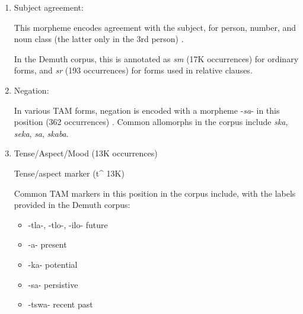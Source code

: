 \documentclass[11pt,letterpaper]{article}
\begin{document}
\begin{enumerate}
    \item Subject agreement: 
    
    This morpheme encodes agreement with the subject, for person, number, and noun class (the latter only in the 3rd person) \cite[]{doke1967textbook} \cite[p. 162]{guma1971outline}.
    
    In the Demuth corpus, this is annotated as \textit{sm} (17K occurrences) for ordinary forms, and \textit{sr} (193 occurrences) for forms used in relative clauses.

   
    
    \item Negation:
    
    In various TAM forms, negation is encoded with a morpheme -\textit{sa}- in this position (362 occurrences) \cite[p. 172]{guma1971outline} \cite[]{doke1967textbook}.
    Common allomorphs in the corpus include \textit{ska}, \textit{seka}, \textit{sa}, \textit{skaba}.
    
    
    
    \item Tense/Aspect/Mood (13K occurrences)
    
    Tense/aspect marker (t\^{} 13K) \cite[p. 165]{guma1971outline}
    
    Common TAM markers in this position in the corpus include, with the labels provided in the Demuth corpus:
    
    \begin{itemize}
    \item -tla-, -tlo-, -ilo- future \cite[--412]{doke1967textbook}
    \item -a- present \cite[]{doke1967textbook}
    \item -ka- potential \cite[--428]{doke1967textbook}
    \item -sa- persistive \cite[--418]{doke1967textbook}
    \item -tswa- recent past \cite[--406]{doke1967textbook} 
    
    
    \end{itemize}
    

\end{enumerate}
\end{document}
